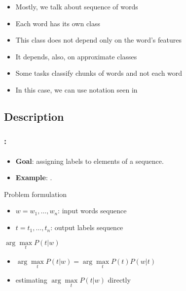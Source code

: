 \documentclass[xcolor=table]{beamer}
\begin{document}
\begin{frame}
	\frametitle{\insertshortsubtitle}
	\framesubtitle{\insertsection}
	
	\begin{itemize}
		\item Mostly, we talk about sequence of words
		\item Each word has its own class
		\item This class does not depend only on the word's features
		\item It depends, also, on approximate classes
		\item Some tasks classify chunks of words and not each word
		\item In this case, we can use  notation seen in 
	\end{itemize}
	
\end{frame}

\subsection{Description}

\begin{frame}
	\frametitle{\insertshortsubtitle: \insertsection}
	\framesubtitle{\insertsubsection}

	\begin{itemize}
		\item \textbf{Goal}: assigning labels to elements of a sequence.
		\item \textbf{Example}: .
	\end{itemize}
	
	\begin{block}{Problem formulation}
		\begin{itemize}
			\item $w = w_1, \ldots, w_n$: input words sequence
			\item $t = t_1, \ldots, t_n$: output labels sequence
		\end{itemize}
		\begin{center}
			$ \arg\max\limits_t P(t | w)$
		\end{center}
		
		\begin{itemize}
			\item {} $ \arg\max\limits_t P(t | w) = \arg\max\limits_t P(t) P(w | t) $
			\item {} estimating $\arg\max\limits_t P(t | w)$ directly
		\end{itemize}
	\end{block}

\end{frame}
\end{document}
